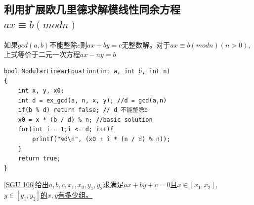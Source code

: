 \subsection{利用扩展欧几里德求解模线性同余方程 $ax\equiv b(mod n)$}
如果$gcd(a,b)$不能整除$c$则$ax+by=c$无整数解。对于$ax\equiv b(mod n)(n>0)$,上式等价于二元一次方程$ax-ny=b$
\begin{lstlisting}
bool ModularLinearEquation(int a, int b, int n)
{
    int x, y, x0;
    int d = ex_gcd(a, n, x, y); //d = gcd(a,n)
    if(b % d) return false; // d 不能整除b
    x0 = x * (b / d) % n; //basic solution
    for(int i = 1;i <= d; i++){
        printf("%d\n", (x0 + i * (n / d) % n));
    }
    return true;
}
\end{lstlisting}

\underline{[SGU 106]给出$a,b,c,x_1,x_2,y_1,y_2$求满足$ax + by + c = 0$且$x\in[x_1,x_2]$,$ y\in[y_1,y_2]$的$x,y$有多少组。} \\

